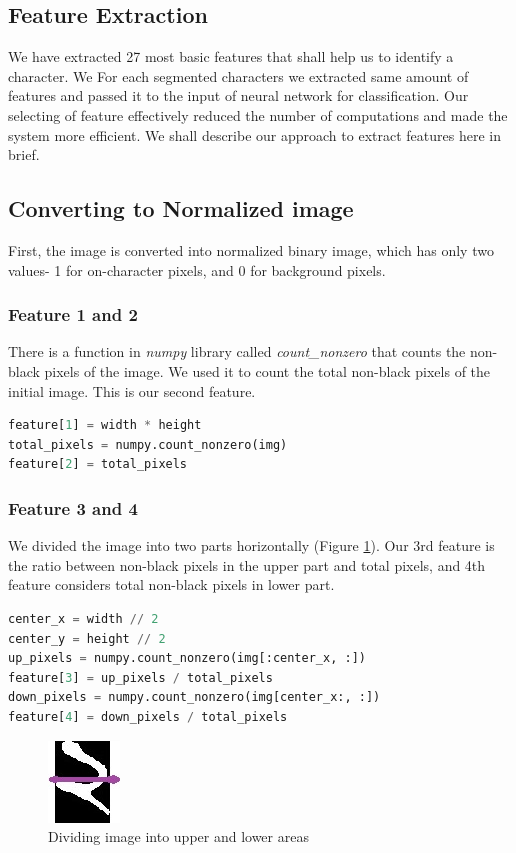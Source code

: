 \documentclass{standalone}
\begin{document}
\subsection{Feature Extraction}
We have extracted 27 most basic features that shall help us to identify a character. We For each segmented characters we extracted same amount of features and passed it to the input of neural network for classification. Our selecting of feature effectively reduced the number of computations and made the system more efficient. We shall describe our approach to extract features here in brief.

\subsection{Converting to Normalized image}
First, the image is converted into normalized binary image, which has only two values- 1 for on-character pixels, and 0 for background pixels.

\subsubsection{Feature 1 and 2}
There is a function in {\it numpy} library called {\it count\_nonzero} that counts the non-black pixels of the image. We used it to count the total non-black pixels of the initial image. This is our second feature.
\begin{lstlisting}[language=Python]
feature[1] = width * height
total_pixels = numpy.count_nonzero(img)
feature[2] = total_pixels
\end{lstlisting}

\subsubsection{Feature 3 and 4}
We divided the image into two parts horizontally (Figure \ref{fig:FeatureHor}). Our 3rd feature is the ratio between non-black pixels in the upper part and total pixels, and 4th feature considers total non-black pixels in lower part.
\begin{lstlisting}[language=Python]
center_x = width // 2
center_y = height // 2
up_pixels = numpy.count_nonzero(img[:center_x, :])
feature[3] = up_pixels / total_pixels
down_pixels = numpy.count_nonzero(img[center_x:, :])
feature[4] = down_pixels / total_pixels
\end{lstlisting}

\begin{figure}
\centering
\includegraphics{img/feature/hor}
\caption{Dividing image into upper and lower areas}
\label{fig:FeatureHor}
\end{figure}
\end{document}
